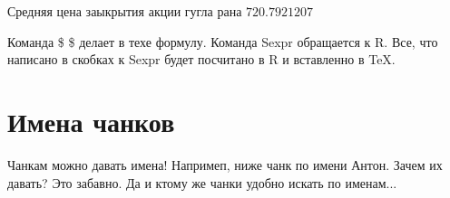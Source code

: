 \documentclass[12pt, a4paper]{article}\usepackage[]{graphicx}\usepackage[]{color}
\begin{document}
Средняя цена заыкрытия акции гугла рана $720.7921207$

Команда \$ \$ делает в техе формулу. Команда Sexpr обращается к R. Все, что написано в скобках к Sexpr будет посчитано в R и вставленно в \TeX. 


\section{Имена чанков}

Чанкам можно давать имена! Напримеп, ниже чанк по имени Антон. Зачем их давать? Это забавно. Да и ктому же чанки удобно искать по именам...
\end{document}

